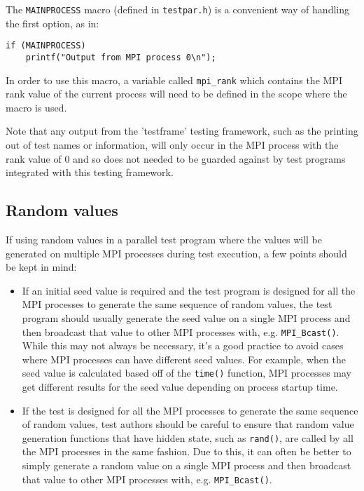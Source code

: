 \documentclass[../HDF5_RFC.tex]{subfiles}
\begin{document}
The \texttt{MAINPROCESS} macro (defined in \texttt{testpar.h}) is a convenient way of handling the first
option, as in:

\begin{verbatim}
if (MAINPROCESS)
    printf("Output from MPI process 0\n");
\end{verbatim}

In order to use this macro, a variable called \texttt{mpi\_rank} which contains the MPI rank value of
the current process will need to be defined in the scope where the macro is used.

Note that any output from the 'testframe' testing framework, such as the printing out of test names or information, will only occur in the MPI process with the rank value of 0 and so does not needed to be
guarded against by test programs integrated with this testing framework.

\subsection{Random values}

If using random values in a parallel test program where the values will be generated on multiple MPI
processes during test execution, a few points should be kept in mind:

\begin{itemize}

    \item If an initial seed value is required and the test program is designed for all the MPI processes
          to generate the same sequence of random values, the test program should usually generate the
          seed value on a single MPI process and then broadcast that value to other MPI processes with,
          e.g. \texttt{MPI\_Bcast()}. While this may not always be necessary, it's a good practice to
          avoid cases where MPI processes can have different seed values. For example, when the seed
          value is calculated based off of the \texttt{time()} function, MPI processes may get different
          results for the seed value depending on process startup time.
    \item If the test is designed for all the MPI processes to generate the same sequence of random
          values, test authors should be careful to ensure that random value generation functions that
          have hidden state, such as \texttt{rand()}, are called by all the MPI processes in the same
          fashion. Due to this, it can often be better to simply generate a random value on a single
          MPI process and then broadcast that value to other MPI processes with, e.g. \texttt{MPI\_Bcast()}.

\end{itemize}
\end{document}
